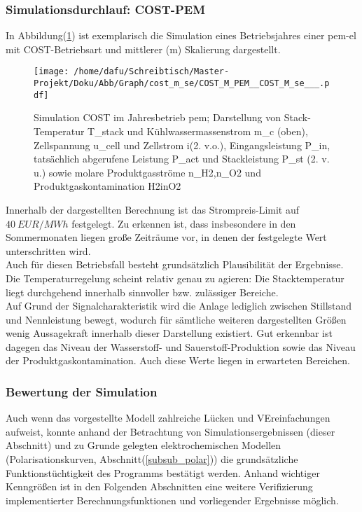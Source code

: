 \documentclass[onecolumn,10pt,titlepage]{article}
\begin{document}
\subsubsection{Simulationsdurchlauf: COST-PEM}
In Abbildung(\ref{fig:plt_se_COST_PEM}) ist exemplarisch die Simulation eines Betriebsjahres einer \gls{pem}-\gls{el} mit COST-Betriebsart und mittlerer (m) Skalierung dargestellt.
\begin{figure}[H]
	
	\centering
	\texttt{[image: /home/dafu/Schreibtisch/Master-Projekt/Doku/Abb/Graph/cost\_m\_se/COST\_M\_PEM\_\_COST\_M\_se\_\_\_.pdf]}
	
	\caption[Simulation COST im Jahresbetrieb \gls{pem}]{Simulation COST im Jahresbetrieb \gls{pem}; Darstellung von Stack-Temperatur \gls{T_stack} und Kühlwassermassenstrom \gls{m_c} (oben), Zellspannung \gls{u_cell} und Zellstrom \gls{i}(2. v.o.), Eingangsleistung \gls{P_in},  tatsächlich abgerufene Leistung \gls{P_act} und Stackleistung \gls{P_st} (2. v. u.) sowie molare Produktgasströme \gls{n_H2},\gls{n_O2} und Produktgaskontamination \gls{H2inO2}}
	\label{fig:plt_se_COST_PEM} 
\end{figure}
Innerhalb der dargestellten Berechnung ist das Strompreis-Limit auf $40~ EUR/MWh$ festgelegt. Zu erkennen ist, dass insbesondere in den Sommermonaten liegen große Zeiträume vor, in denen der festgelegte Wert unterschritten wird.\\
Auch für diesen Betriebsfall besteht grundsätzlich Plausibilität der Ergebnisse. Die Temperaturregelung scheint relativ genau zu agieren: Die Stacktemperatur liegt durchgehend innerhalb sinnvoller bzw. zulässiger Bereiche.\\
Auf Grund der Signalcharakteristik wird die Anlage lediglich zwischen Stillstand und Nennleistung bewegt, wodurch für sämtliche weiteren dargestellten Größen wenig Aussagekraft innerhalb dieser Darstellung existiert. Gut erkennbar ist dagegen das Niveau der Wasserstoff- und Sauerstoff-Produktion sowie das Niveau der Produktgaskontamination. Auch diese Werte liegen in erwarteten Bereichen.\\
\subsubsection{Bewertung der Simulation}
Auch wenn das vorgestellte Modell zahlreiche Lücken und VEreinfachungen aufweist, konnte anhand der Betrachtung von Simulationsergebnissen (dieser Abschnitt) und zu Grunde gelegten elektrochemischen Modellen (Polarisationskurven, Abschnitt(\ref{subsub_polar})) die grundsätzliche Funktionstüchtigkeit des Programms bestätigt werden. Anhand wichtiger Kenngrößen ist in den Folgenden Abschnitten eine weitere Verifizierung implementierter Berechnungsfunktionen und vorliegender Ergebnisse möglich.
\end{document}
